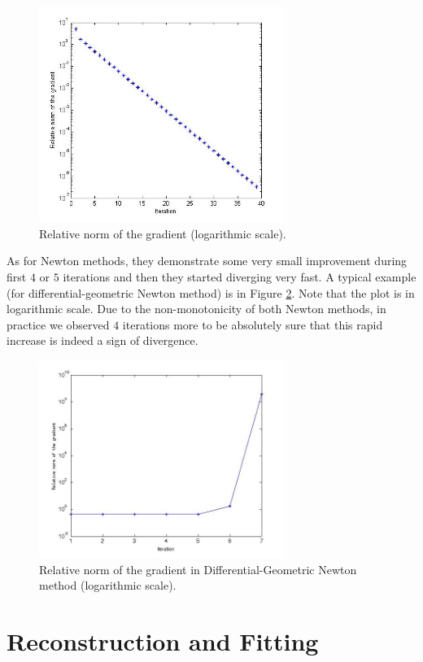 \begin{figure}
        \centering
                \includegraphics[width=8cm]{images/hooi_gradient_plot.jpg}
        \caption{Relative norm of the gradient (logarithmic scale).}
        \label{fig:hooi_grad_plot}
\end{figure}


As for Newton methods, they demonstrate some very small improvement
during first $4$ or $5$ iterations and then they started
diverging very fast. A typical example (for differential-geometric Newton method) is in Figure \ref{fig:grad_newgr}.
Note that the plot is in logarithmic scale. Due to the non-monotonicity of both Newton methods, in practice we observed
$4$ iterations more to be absolutely sure that this rapid increase is indeed a sign of divergence. 


\begin{figure}
        \centering
                \includegraphics[width=8cm]{images/grad_newgr.jpg}
        \caption{Relative norm of the gradient in Differential-Geometric Newton method (logarithmic scale).}
        \label{fig:grad_newgr}
\end{figure}


\section{Reconstruction and Fitting}
\label{eval_fit}

